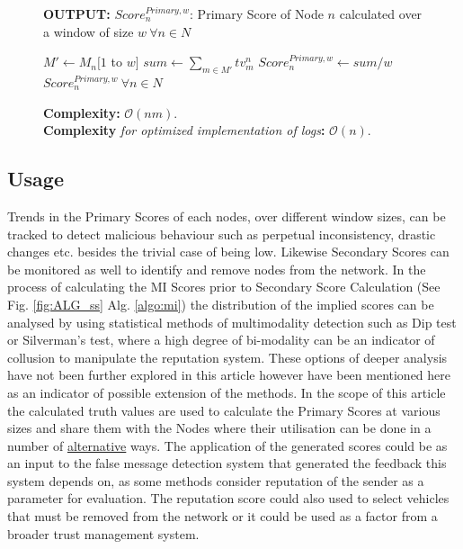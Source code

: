 \documentclass[journal]{IEEEtran}
\begin{document}
\begin{figure}[!t]
\begin{algorithm}[H]
\begin{enumerate}
	\end{enumerate}
	\textbf{OUTPUT:} $ Score^{Primary,w}_n $: Primary Score of Node $ n $ calculated over a window of size $ w\ \forall n\in N$
	\begin{algorithmic}[1]
			\STATE $ M' \leftarrow M_n[1$ to $w] $
			\STATE $ sum \leftarrow \sum_{m\in M'}tv^n_m $ 
			\STATE $ Score^{Primary,w}_n \leftarrow sum/w $ 
		\ENDFOR
		\RETURN $ Score^{Primary,w}_n\ \forall n\in N$
	\end{algorithmic}
	\textbf{Complexity:} $\mathcal{O}(nm)$.\\
	\textbf{Complexity}\textit{ for optimized implementation of logs}\textbf{:} $\mathcal{O}(n)$.
\end{algorithm}
\end{figure}
\subsection{Usage}
\label{sec:PM:usage}
Trends in the Primary Scores of each nodes, over different window sizes, can be tracked to detect malicious behaviour such as perpetual inconsistency, drastic changes etc. besides the trivial case of being low. Likewise Secondary Scores can be monitored as well to identify and remove nodes from the network. In the process of calculating the MI Scores prior to Secondary Score Calculation (See Fig. \ref{fig:ALG_ss} Alg. \ref{algo:mi}) the distribution of the implied scores can be analysed by using statistical methods of multimodality detection such as Dip test\cite{c:DipTest} or Silverman's test\cite{c:SilvermansTest}, where a high degree of bi-modality can be an indicator of collusion to manipulate the reputation system. These options of deeper analysis have not been further explored in this article however have been mentioned here as an indicator of possible extension of the methods. In the scope of this article the calculated truth values are used to calculate the Primary Scores at various sizes and share them with the Nodes where their utilisation can be done in a number of \underline{alternative} ways. The application of the generated scores could be as an input to the false message detection system that generated the feedback this system depends on, as some methods consider reputation of the sender as a parameter for evaluation\cite{c:messagefilterCoE}. The reputation score could also used to select vehicles that must be removed from the network or it could be used as a factor from a broader trust management system\cite{c:trustInSIoV}.
\end{document}
